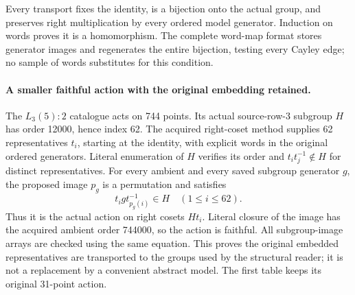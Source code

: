 \documentclass[11pt]{article}
\begin{document}
Every transport fixes the identity, is a bijection onto the actual group,
and preserves right multiplication by every ordered model generator.
Induction on words proves it is a homomorphism. The complete word-map format
stores generator images and regenerates the entire bijection, testing every
Cayley edge; no sample of words substitutes for this condition.
\newpage
\paragraph{A smaller faithful action with the original embedding retained.}
The $L_3(5):2$ catalogue acts on 744 points. Its actual source-row-3 subgroup
$H$ has order 12000, hence index 62. The acquired right-coset method supplies
62 representatives $t_i$, starting at the identity, with explicit words in
the original ordered generators. Literal enumeration of $H$ verifies its
order and $t_i t_j^{-1}\notin H$ for distinct representatives. For every
ambient and every saved subgroup generator $g$, the proposed image $p_g$
is a permutation and satisfies
\[
                 t_i g t_{p_g(i)}^{-1}\in H\quad(1\leq i\leq62).
\]
Thus it is the actual action on right cosets $Ht_i$. Literal closure of the
image has the acquired ambient order 744000, so the action is faithful.
All subgroup-image arrays are checked using the same equation. This proves
the original embedded representatives are transported to the groups used by
the structural reader; it is not a replacement by a convenient abstract model.
The first table keeps its original 31-point action.
\end{document}
